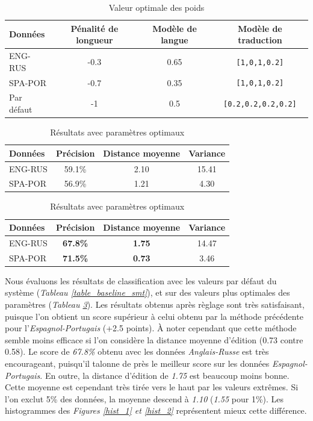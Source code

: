 \documentclass{article}
\begin{document}
\begin{table}[H]
\begin{center}
\caption{Valeur optimale des poids}
\label{table_poids}
\begin{tabular}{|l|c|c|c|}
\hline
Données&Pénalité de longueur&Modèle de langue&Modèle de traduction\\
\hline
ENG-RUS&-0.3&0.65&\verb|[1,0,1,0.2]|\\
\hline
SPA-POR&-0.7&0.35&\verb|[1,0,1,0.2]|\\
\hline
\hline
Par défaut&-1&0.5&\verb|[0.2,0.2,0.2,0.2]|\\
\hline
\end{tabular}
\end{center}
\end{table}

\begin{table}[H]
\caption{Résultats de la baseline (paramètres par défaut)}
\label{table_baseline_smt}
\begin{center}
\begin{tabular}{|l|c|c|c|}
\hline
Données&Précision&Distance moyenne&Variance\\
\hline
ENG-RUS&59.1\%&2.10&15.41\\
\hline
SPA-POR&56.9\%&1.21&4.30\\
\hline
\end{tabular}
\end{center}

\caption{Résultats avec paramètres optimaux}
\label{table_opt_smt}
\begin{center}
\begin{tabular}{|l|c|c|c|}
\hline
Données&Précision&Distance moyenne&Variance\\
\hline
ENG-RUS&\textbf{67.8\%}&\textbf{1.75}&14.47\\
\hline
SPA-POR&\textbf{71.5\%}&\textbf{0.73}&3.46\\
\hline
\end{tabular}
\end{center}
\end{table}

Nous évaluons les résultats de classification avec les valeurs par défaut du système (\emph{Tableau \ref{table_baseline_smt}}), et sur des valeurs plus optimales des paramètres (\emph{Tableau \ref{table_opt_smt}}). Les résultats obtenus après règlage sont très satisfaisant, puisque l'on obtient un score supérieur à celui obtenu par la méthode précédente pour l'\emph{Espagnol-Portugais} (+2.5 points). À noter cependant que cette méthode semble moins efficace si l'on considère la distance moyenne d'édition (0.73 contre 0.58).
Le score de \emph{67.8\%} obtenu avec les données \emph{Anglais-Russe} est très encourageant, puisqu'il talonne de près le meilleur score sur les données \emph{Espagnol-Portugais}. En outre, la distance d'édition de \emph{1.75} est beaucoup moins bonne. Cette moyenne est cependant très tirée vers le haut par les valeurs extrêmes. Si l'on exclut 5\% des données, la moyenne descend à \emph{1.10} (\emph{1.55} pour 1\%). 
Les histogrammes des \emph{Figures \ref{hist_1} et \ref{hist_2}} représentent mieux cette différence.
\end{document}
